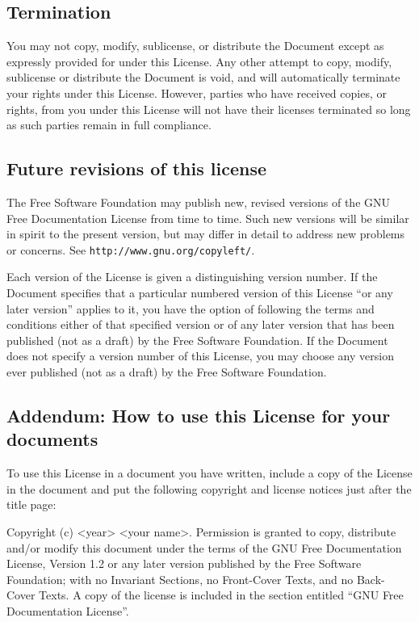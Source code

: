 \subsection{Termination}

You may not copy, modify, sublicense, or distribute the Document except
as expressly provided for under this License. Any other attempt to
copy, modify, sublicense or distribute the Document is void, and will
automatically terminate your rights under this License. However, parties
who have received copies, or rights, from you under this License will
not have their licenses terminated so long as such parties remain
in full compliance.

\subsection{Future revisions of this license}

The Free Software Foundation may publish new, revised versions of
the GNU Free Documentation License from time to time. Such new versions
will be similar in spirit to the present version, but may differ in
detail to address new problems or concerns. See \texttt{\small{}http://www.gnu.org/copyleft/}.

Each version of the License is given a distinguishing version number.
If the Document specifies that a particular numbered version of this
License ``or any later version'' applies to it, you have the option
of following the terms and conditions either of that specified version
or of any later version that has been published (not as a draft) by
the Free Software Foundation. If the Document does not specify a version
number of this License, you may choose any version ever published
(not as a draft) by the Free Software Foundation.

\subsection{Addendum: How to use this License for your documents}

To use this License in a document you have written, include a copy
of the License in the document and put the following copyright and
license notices just after the title page:

Copyright (c) <year> <your name>. Permission is granted to copy, distribute
and/or modify this document under the terms of the GNU Free Documentation
License, Version 1.2 or any later version published by the Free Software
Foundation; with no Invariant Sections, no Front-Cover Texts, and
no Back-Cover Texts. A copy of the license is included in the section
entitled ``GNU Free Documentation License''.

